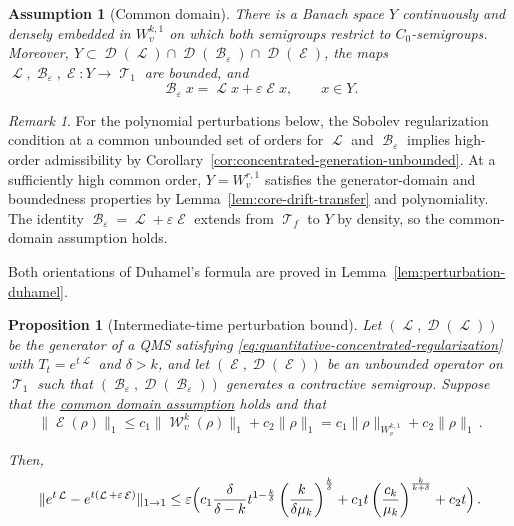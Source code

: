\documentclass[11pt]{article}
\theoremstyle{myplain}
\newtheorem{prop}[prop]{Proposition}
\newtheorem*{assum*}{Assumption}
\theoremstyle{mydefinition}
\theoremstyle{remark}
\newtheorem{rmk}[ex]{Remark}
\DeclareMathOperator{\cB}{\mathcal{B}}
\DeclareMathOperator{\cD}{\mathcal{D}}
\DeclareMathOperator{\cE}{\mathcal{E}}
\DeclareMathOperator{\cL}{\mathcal{L}}
\DeclareMathOperator{\cT}{\mathcal{T}}
\DeclareMathOperator{\cW}{\mathcal{W}}
\DeclareMathOperator{\1}{\mathds{1}}
\begin{document}
        \begin{assum*}[Common domain]\label{assum:perturbation-common-domain}
            There is a Banach space $Y$ continuously and densely embedded in $W_v^{k,1}$ on which both semigroups restrict to $C_0$-semigroups. Moreover, $Y \subset \cD(\cL) \cap \cD(\cB_\varepsilon) \cap \cD(\cE)$, the maps $\cL,\cB_\varepsilon,\cE:Y \to \cT_1$ are bounded, and
            \begin{equation*}
                \cB_\varepsilon x = \cL x + \varepsilon\cE x,
                \qquad x \in Y.
            \end{equation*}
        \end{assum*}
        \begin{rmk}
            For the polynomial perturbations below, the Sobolev regularization condition at a common unbounded set of orders for $\cL$ and $\cB_\varepsilon$ implies high-order admissibility by Corollary~\ref{cor:concentrated-generation-unbounded}. At a sufficiently high common order, $Y=W_v^{r,1}$ satisfies the generator-domain and boundedness properties by Lemma~\ref{lem:core-drift-transfer} and polynomiality. The identity $\cB_\varepsilon=\cL+\varepsilon\cE$ extends from $\cT_f$ to $Y$ by density, so the common-domain assumption holds.
        \end{rmk}
        Both orientations of Duhamel's formula are proved in Lemma~\ref{lem:perturbation-duhamel}.
        
        \begin{prop}[Intermediate-time perturbation bound]\label{prop:intermediate-time-perturbation-bound}
            Let $(\cL,\cD(\cL))$ be the generator of a QMS satisfying \eqref{eq:quantitative-concentrated-regularization} with $T_t=e^{t\cL}$ and $\delta>k$, and let $(\cE,\cD(\cE))$ be an unbounded operator on $\cT_1$ such that $(\cB_\varepsilon,\cD(\cB_\varepsilon))$ generates a contractive semigroup. Suppose that the \hyperref[assum:perturbation-common-domain]{common domain assumption} holds and that
            \begin{equation*}
                \|\cE(\rho)\|_1\leq c_1\|\cW^{k}_v(\rho)\|_1+c_2\|\rho\|_1 = c_1\|\rho\|_{W^{k,1}_v}+c_2\|\rho\|_1\,.
            \end{equation*}

            Then,
            \begin{equation*}
                \|e^{t\cL}-e^{t(\cL+\varepsilon\cE)}\|_{1\rightarrow1}\leq \varepsilon \Bigl(c_1 \frac{\delta}{\delta-k} t^{1-\frac{k}{\delta}}\left(\frac{k}{\delta \mu_k} \right)^{\frac{k}{\delta}} + c_1 t\left( \frac{c_k}{\mu_k} \right)^{\frac{k}{k + \delta}} + c_2 t \Bigr)\,.
            \end{equation*}

        \end{prop}
\end{document}
